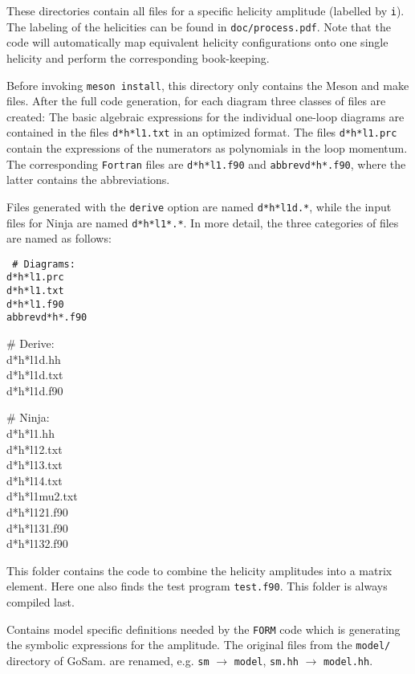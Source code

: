 \documentclass[11pt,a4paper]{refrep}
\newcommand{\gosamversion}{{3{.}0}}
\newcommand{\gosamv}[1][\gosamversion]{{\sc GoSam}\xspace}
\newcommand{\form}{{\tt FORM}\xspace}
\newcommand{\ninja}{{\sc Ninja}\xspace}
\begin{document}
 These directories contain all files for a specific
helicity amplitude (labelled by {\tt i}). The labeling of the helicities can be found in
\texttt{doc/process.pdf}. 
Note that the code will automatically map equivalent helicity 
configurations onto one single helicity and perform the corresponding book-keeping.

Before invoking \texttt{meson install}, 
this directory only contains the Meson and make files. After the full code
generation, for each diagram three classes of files are created: The
basic algebraic expressions for the individual one-loop diagrams are
contained in the files {\tt d*h*l1.txt} in an optimized format. The
files {\tt d*h*l1.prc} contain the expressions of the numerators as 
polynomials in the loop momentum. The corresponding {\tt Fortran} files
are {\tt d*h*l1.f90} and {\tt abbrevd*h*.f90}, where the latter
contains the abbreviations. 

Files generated with the {\tt derive} option  are
named {\tt d*h*l1d.*}, while the input files
for \ninja{}  are named {\tt d*h*l1*.*}. 
In more detail, the three categories of files are named as follows:\\
{\tt
\# Diagrams:\\
 d*h*l1.prc\\
 d*h*l1.txt\\
 d*h*l1.f90\\
 abbrevd*h*.f90

\# Derive:\\
 d*h*l1d.hh\\
 d*h*l1d.txt\\
 d*h*l1d.f90

\# Ninja:\\
 d*h*l1.hh\\
 d*h*l12.txt\\
 d*h*l13.txt\\
 d*h*l14.txt\\
 d*h*l1mu2.txt\\
 d*h*l121.f90\\
 d*h*l131.f90\\
 d*h*l132.f90
}

 This folder contains the code to combine
the helicity amplitudes into a matrix element. Here one also finds
the test program \texttt{test.f90}. This folder is always compiled last.

Contains model specific definitions needed by the \form code
which is generating the symbolic expressions for the amplitude.
The original files from the \texttt{model/} directory of \gosamv. 
are renamed, e.g.
\texttt{sm} $\to$ \texttt{model}, \texttt{sm.hh} $\to$ \texttt{model.hh}.
\end{document}
